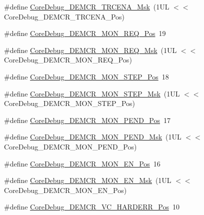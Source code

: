 \begin{DoxyCompactItemize}
\#define \mbox{\hyperlink{group___c_m_s_i_s___core_debug_ga5e99652c1df93b441257389f49407834}{Core\+Debug\+\_\+\+D\+E\+M\+C\+R\+\_\+\+T\+R\+C\+E\+N\+A\+\_\+\+Msk}}~(1\+U\+L $<$$<$ Core\+Debug\+\_\+\+D\+E\+M\+C\+R\+\_\+\+T\+R\+C\+E\+N\+A\+\_\+\+Pos)
\item 
\#define \mbox{\hyperlink{group___c_m_s_i_s___core_debug_ga341020a3b7450416d72544eaf8e57a64}{Core\+Debug\+\_\+\+D\+E\+M\+C\+R\+\_\+\+M\+O\+N\+\_\+\+R\+E\+Q\+\_\+\+Pos}}~19
\item 
\#define \mbox{\hyperlink{group___c_m_s_i_s___core_debug_gae6384cbe8045051186d13ef9cdeace95}{Core\+Debug\+\_\+\+D\+E\+M\+C\+R\+\_\+\+M\+O\+N\+\_\+\+R\+E\+Q\+\_\+\+Msk}}~(1\+U\+L $<$$<$ Core\+Debug\+\_\+\+D\+E\+M\+C\+R\+\_\+\+M\+O\+N\+\_\+\+R\+E\+Q\+\_\+\+Pos)
\item 
\#define \mbox{\hyperlink{group___c_m_s_i_s___core_debug_ga9ae10710684e14a1a534e785ef390e1b}{Core\+Debug\+\_\+\+D\+E\+M\+C\+R\+\_\+\+M\+O\+N\+\_\+\+S\+T\+E\+P\+\_\+\+Pos}}~18
\item 
\#define \mbox{\hyperlink{group___c_m_s_i_s___core_debug_ga2ded814556de96fc369de7ae9a7ceb98}{Core\+Debug\+\_\+\+D\+E\+M\+C\+R\+\_\+\+M\+O\+N\+\_\+\+S\+T\+E\+P\+\_\+\+Msk}}~(1\+U\+L $<$$<$ Core\+Debug\+\_\+\+D\+E\+M\+C\+R\+\_\+\+M\+O\+N\+\_\+\+S\+T\+E\+P\+\_\+\+Pos)
\item 
\#define \mbox{\hyperlink{group___c_m_s_i_s___core_debug_ga1e2f706a59e0d8131279af1c7e152f8d}{Core\+Debug\+\_\+\+D\+E\+M\+C\+R\+\_\+\+M\+O\+N\+\_\+\+P\+E\+N\+D\+\_\+\+Pos}}~17
\item 
\#define \mbox{\hyperlink{group___c_m_s_i_s___core_debug_ga68ec55930269fab78e733dcfa32392f8}{Core\+Debug\+\_\+\+D\+E\+M\+C\+R\+\_\+\+M\+O\+N\+\_\+\+P\+E\+N\+D\+\_\+\+Msk}}~(1\+U\+L $<$$<$ Core\+Debug\+\_\+\+D\+E\+M\+C\+R\+\_\+\+M\+O\+N\+\_\+\+P\+E\+N\+D\+\_\+\+Pos)
\item 
\#define \mbox{\hyperlink{group___c_m_s_i_s___core_debug_ga802829678f6871863ae9ecf60a10425c}{Core\+Debug\+\_\+\+D\+E\+M\+C\+R\+\_\+\+M\+O\+N\+\_\+\+E\+N\+\_\+\+Pos}}~16
\item 
\#define \mbox{\hyperlink{group___c_m_s_i_s___core_debug_gac2b46b9b65bf8d23027f255fc9641977}{Core\+Debug\+\_\+\+D\+E\+M\+C\+R\+\_\+\+M\+O\+N\+\_\+\+E\+N\+\_\+\+Msk}}~(1\+U\+L $<$$<$ Core\+Debug\+\_\+\+D\+E\+M\+C\+R\+\_\+\+M\+O\+N\+\_\+\+E\+N\+\_\+\+Pos)
\item 
\#define \mbox{\hyperlink{group___c_m_s_i_s___core_debug_gaed9f42053031a9a30cd8054623304c0a}{Core\+Debug\+\_\+\+D\+E\+M\+C\+R\+\_\+\+V\+C\+\_\+\+H\+A\+R\+D\+E\+R\+R\+\_\+\+Pos}}~10
\item 
$$
\end{DoxyCompactItemize}
